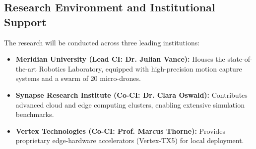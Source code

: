 \subsection{Research Environment and Institutional Support}
The research will be conducted across three leading institutions:
\begin{itemize}[leftmargin=*,noitemsep]
    \item \textbf{Meridian University (Lead CI: Dr. Julian Vance):} Houses the state-of-the-art Robotics Laboratory, equipped with high-precision motion capture systems and a swarm of 20 micro-drones.
    \item \textbf{Synapse Research Institute (Co-CI: Dr. Clara Oswald):} Contributes advanced cloud and edge computing clusters, enabling extensive simulation benchmarks.
    \item \textbf{Vertex Technologies (Co-CI: Prof. Marcus Thorne):} Provides proprietary edge-hardware accelerators (Vertex-TX5) for local deployment.
\end{itemize}
